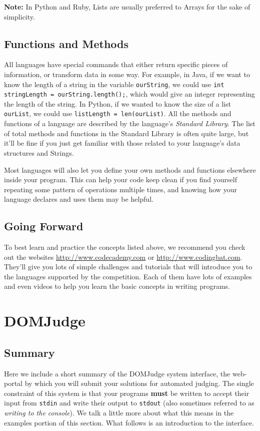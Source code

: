 \documentclass[a4paper]{article}
\begin{document}
\textbf{Note:} In Python and Ruby, Lists are usually preferred to Arrays for the sake of simplicity. 

\subsection{Functions and Methods}
All languages have special commands that either return specific pieces of information, or transform data in some way. For example, in Java, if we want to know the length of a string in the variable \texttt{ourString}, we could use \texttt{int stringLength = ourString.length();}, which would give an integer representing the length of the string. In Python, if we wanted to know the size of a list \texttt{ourList}, we could use \texttt{listLength = len(ourList)}. All the methods and functions of a language are described by the language's \textit{Standard Library}. The list of total methods and functions in the Standard Library is often quite large, but it'll be fine if you just get familiar with those related to your language's data structures and Strings. 

Most languages will also let you define your own methods and functions elsewhere inside your program. This can help your code keep clean if you find yourself repeating some pattern of operations multiple times, and knowing how your language declares and uses them may be helpful.

\subsection{Going Forward}
To best learn and practice the concepts listed above, we recommend you check out the websites \url{http://www.codecademy.com} or \url{http://www.codingbat.com}. They'll give you lots of simple challenges and tutorials that will introduce you to the languages supported by the competition. Each of them have lots of examples and even videos to help you learn the basic concepts in writing programs.

\section{DOMJudge}
\subsection{Summary}
Here we include a short summary of the DOMJudge system interface, the web-portal by which you will submit your solutions for automated judging. The single constraint of this system is that your programs \textbf{must} be written to accept their input from \texttt{stdin} and write their output to \texttt{stdout} (also sometimes referred to as \textit{writing to the console}). We talk a little more about what this means in the examples portion of this section. What follows is an introduction to the interface.
\end{document}
